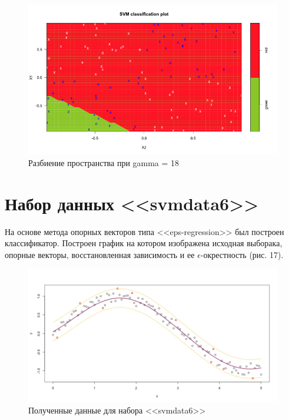 \documentclass[]{article}
\numberwithin{equation}{section}
\begin{document}
        \begin{figure}[H]
            \centering
            \includegraphics[width = 0.9\linewidth]{data/data5_poly_18.png}
            \caption{Разбиение пространства при gamma = 18}
        \end{figure}

    \section{Набор данных <<svmdata6>>}
        На основе метода опорных векторов типа <<eps-regression>> был построен классификатор. Построен график на котором изображена исходная выборака, опорные векторы, восстановленная зависимость и ее $\epsilon$-окрестность (рис. 17).

        \begin{figure}[H]
            \centering
            \includegraphics[width = 0.9\linewidth]{data/data6_eps.png}
            \caption{Полученные данные для набора <<svmdata6>>}
        \end{figure}
\end{document}
